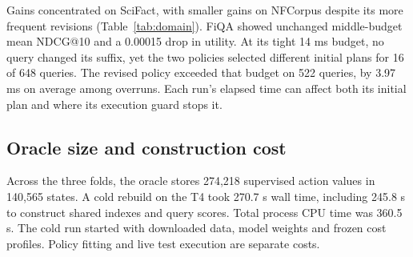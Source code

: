 \documentclass{article}
\newcommand{\datatable}[1]{\begingroup\setlength{\tabcolsep}{4pt}\endgroup}
\begin{document}
\begin{table}[htbp]\centering
\caption{End-to-end differences between the policy allowing one revision and the one-shot policy with the same BM25 reuse. Revised is the equal-domain percentage of queries that changed their suffix. Intervals use 4,000 paired within-domain query resamples.}
\label{tab:paired}\datatable{paired}
\end{table}

Gains concentrated on SciFact, with smaller gains on NFCorpus despite its more frequent revisions (Table~\ref{tab:domain}). FiQA showed unchanged middle-budget mean NDCG@10 and a 0.00015 drop in utility. At its tight 14 ms budget, no query changed its suffix, yet the two policies selected different initial plans for 16 of 648 queries. The revised policy exceeded that budget on 522 queries, by 3.97 ms on average among overruns. Each run's elapsed time can affect both its initial plan and where its execution guard stops it.

\begin{table}[htbp]\centering
\caption{Where the gain occurred. Each utility difference compares the two shared-BM25 policies on the indicated domain. The last column counts explicit revisions at the tight, middle and loose budgets.}
\label{tab:domain}\datatable{domain}
\end{table}

\subsection{Oracle size and construction cost}
\begin{table}[htbp]\centering
\caption{Oracle supervision and cached construction cost, per fold of 768 distinct training queries. Each row of the oracle table represents a state and contains one target value per feasible action, including Stop, which may be the sole feasible action. MiB denotes compressed size. Times include enumeration and writing.}
\label{tab:oracle}\datatable{oracle}
\end{table}
Across the three folds, the oracle stores 274,218 supervised action values in 140,565 states. A cold rebuild on the T4 took 270.7 s wall time, including 245.8 s to construct shared indexes and query scores. Total process CPU time was 360.5 s. The cold run started with downloaded data, model weights and frozen cost profiles. Policy fitting and live test execution are separate costs.
\end{document}
